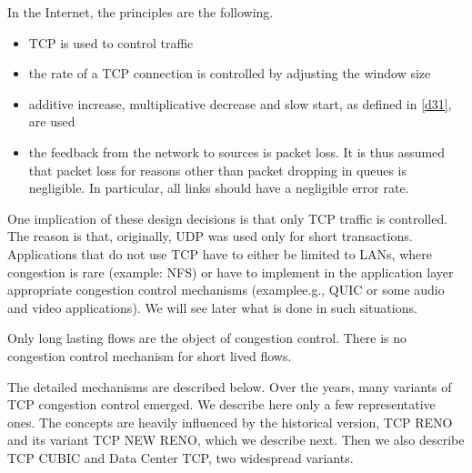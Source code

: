 In the Internet, the
principles are the following.
\begin{itemize}
    \item TCP is used to control traffic

        \item  the rate of a TCP connection is controlled by adjusting the
        window size

        \item  additive increase, multiplicative decrease and slow start, as defined in \cref{d31},
        are
        used

        \item  the feedback from the network to sources is packet loss. It is
        thus assumed that packet loss for reasons other than
        packet dropping in queues is negligible. In particular, all links
        should have a negligible error rate.
\end{itemize}



One implication of these design decisions is that only TCP traffic is
controlled.  The reason is that, originally, UDP was used only for
short transactions.  Applications that do not use TCP have to either
be limited to LANs, where congestion is rare (example: NFS) or have to
implement in the application layer appropriate congestion control
mechanisms (examplee.g., QUIC or some audio and video applications).  We will see later
what is done in such situations.

Only long lasting flows are the object of congestion control.  There
is no congestion control mechanism for short lived flows.

The detailed mechanisms are described below.  Over the years, many variants of TCP congestion control emerged. We describe here only a few representative ones. The concepts are heavily influenced by the historical version, TCP RENO and its variant TCP NEW RENO, which we describe next. Then we also describe TCP CUBIC and Data Center TCP, two widespread variants.

%
%


